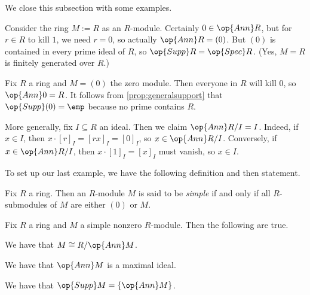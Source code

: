 We close this subsection with some examples.
\begin{example}
	Consider the ring $M:=R$ as an $R$-module. Certainly $0\in\op{Ann}R$, but for $r\in R$ to kill $1$, we need $r=0$, so actually $\op{Ann}R=(0)$. But $(0)$ is contained in every prime ideal of $R$, so $\op{Supp}R=\op{Spec}R$. (Yes, $M=R$ is finitely generated over $R$.)
\end{example}
\begin{ex} \label{ex:emptysupport}
	Fix $R$ a ring and $M=(0)$ the zero module. Then everyone in $R$ will kill $0$, so $\op{Ann}0=R$. It follows from \autoref{prop:generalsupport} that $\op{Supp}(0)=\emp$ because no prime contains $R$.
\end{ex}
\begin{example} \label{ex:annrmodi}
	More generally, fix $I\subseteq R$ an ideal. Then we claim $\op{Ann}R/I=I$. Indeed, if $x\in I$, then $x\cdot[r]_I=[rx]_I=[0]_I$, so $x\in\op{Ann}R/I$. Conversely, if $x\in\op{Ann}R/I$, then $x\cdot[1]_I=[x]_I$ must vanish, so $x\in I$.
\end{example}
To set up our last example, we have the following definition and then statement.
\begin{definition}[Simple]
	Fix $R$ a ring. Then an $R$-module $M$ is said to be \textit{simple} if and only if all $R$-submodules of $M$ are either $(0)$ or $M$.
\end{definition}
\begin{exe} \label{exe:classifysimple}
	Fix $R$ a ring and $M$ a simple nonzero $R$-module. Then the following are true.
	\begin{listalph}
		\item We have that $M\cong R/\op{Ann}M$.
		\item We have that $\op{Ann}M$ is a maximal ideal.
		\item We have that $\op{Supp}M=\{\op{Ann}M\}$.
	\end{listalph}
\end{exe}
